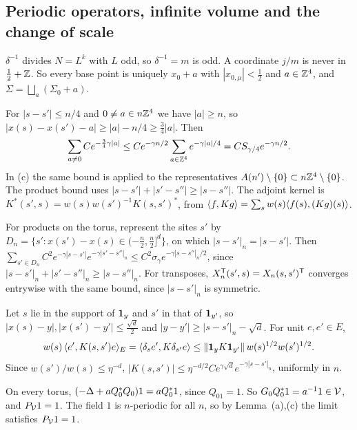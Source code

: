 \subsection{Periodic operators, infinite volume and the change of scale}\label{d11a:infvol}

\begin{detail}\label{d11a:C2}
\begin{step}[Cells]
$\delta^{-1}$ divides $N=L^k$ with $L$ odd, so $\delta^{-1}=m$ is odd. A coordinate $j/m$ is never in $\frac12+\mathbb Z$. So every base point is uniquely $x_0+a$ with $|x_{0,\mu}|<\frac12$ and $a\in\mathbb Z^4$, and $\Sigma=\bigsqcup_a(\Sigma_0+a)$.
\end{step}
\begin{step}[(a); ``as in (a)'' in (c)]
For $|s-s'|\le n/4$ and $0\ne a\in n\mathbb Z^4$ we have $|a|\ge n$, so $|x(s)-x(s')-a|\ge|a|-n/4\ge\frac34|a|$. Then
\[
\sum_{a\ne0}Ce^{-\frac34\gamma|a|}\le Ce^{-\gamma n/2}\sum_{a\in\mathbb Z^4}e^{-\gamma|a|/4}=CS_{\gamma/4}e^{-\gamma n/2}.
\]
In (c) the same bound is applied to the representatives $A(n')\setminus\{0\}\subset n\mathbb Z^4\setminus\{0\}$. The product bound uses $|s-s'|+|s'-s''|\ge|s-s''|$. The adjoint kernel is $K^*(s',s)=w(s)w(s')^{-1}K(s,s')^*$, from $\langle f,Kg\rangle=\sum_sw(s)\langle f(s),(Kg)(s)\rangle$.
\end{step}
\begin{step}
For products on the torus, represent the sites $s'$ by $D_n=\{s':x(s')-x(s)\in(-\frac n2,\frac n2]^d\}$, on which $|s-s'|_n=|s-s'|$. Then $\sum_{s'\in D_n}C^2e^{-\gamma|s-s'|}e^{-\gamma|s'-s''|_n}\le C^2\sigma_\gamma e^{-\gamma|s-s''|_n/2}$, since $|s-s'|_n+|s'-s''|_n\ge|s-s''|_n$. For transposes, $X^{\sf T}_n(s',s)=X_n(s,s')^{\sf T}$ converges entrywise with the same bound, since $|s-s'|_n$ is symmetric.
\end{step}
\end{detail}

\begin{detail}\label{d11a:C3}
\begin{step}
Let $s$ lie in the support of $\mathbf 1_y$ and $s'$ in that of $\mathbf 1_{y'}$, so $|x(s)-y|,|x(s')-y'|\le\frac{\sqrt d}2$ and $|y-y'|\ge|s-s'|_n-\sqrt d$. For unit $e,e'\in E$,
\[
w(s)\,\langle e',K(s,s')e\rangle_E=\langle \delta_se',K\delta_{s'}e\rangle\le\|\mathbf 1_yK\mathbf 1_{y'}\|\,w(s)^{1/2}w(s')^{1/2}.
\]
Since $w(s')/w(s)\le\eta^{-d}$, $|K(s,s')|\le\eta^{-d/2}Ce^{\gamma\sqrt d}e^{-\gamma|s-s'|_n}$, uniformly in $n$.
\end{step}
\begin{step}[$P_\cV1=1$]
On every torus, $(-\Delta+aQ_0^*Q_0)1=aQ_0^*1$, since $Q_01=1$. So $G_0Q_0^*1=a^{-1}1\in\mathcal V$, and $P_\cV1=1$. The field $1$ is $n$-periodic for all $n$, so by Lemma~(a),(c) the limit satisfies $P_\cV1=1$.
\end{step}
\end{detail}

